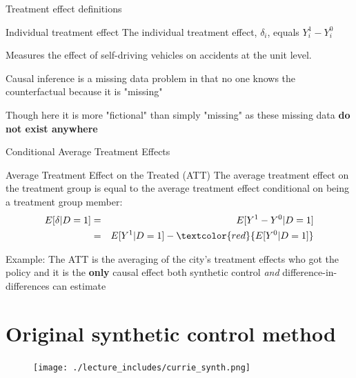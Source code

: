 \documentclass{beamer}
\begin{document}
\begin{frame}{Treatment effect definitions}


	\begin{block}{Individual treatment effect}
	    The individual treatment effect,  $\delta_i$, equals $Y_i^1-Y_i^0$
	\end{block}
Measures the effect of self-driving vehicles on accidents at the unit level. 

\bigskip

Causal inference is a missing data problem in that no one knows the counterfactual because it is "missing" 

\bigskip

Though here it is more "fictional" than simply "missing" as these missing data \textbf{do not exist anywhere}

	
\end{frame}


\begin{frame}{Conditional Average Treatment Effects}	
	\begin{block}{Average Treatment Effect on the Treated (ATT)}
	The average treatment effect on the treatment group is equal to the average treatment effect conditional on being a treatment group member:
		\begin{eqnarray*}
		E[\delta|D=1]&=&E[Y^1-Y^0|D=1] \nonumber \\
		&=&E[Y^1|D=1]-\textcolor{red}{E[Y^0|D=1]}
		\end{eqnarray*}
	\end{block}
	
	\bigskip

Example: The ATT is the averaging of the city's treatment effects who got the policy and it is the \textbf{only} causal effect both synthetic control \emph{and} difference-in-differences can estimate
	
\end{frame}




\section{Original synthetic control method}


\begin{frame}[plain]
	\begin{figure}
	\texttt{[image: ./lecture\_includes/currie\_synth.png]}
	\end{figure}
\end{frame}
\end{document}
